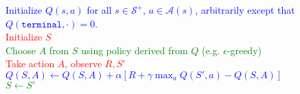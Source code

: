 \documentclass{standalone}
\begin{document}
\pagestyle{empty}
\begin{algorithm}[H]
  \KwInput{Step size $\alpha \in (0, 1]$, and a small $\epsilon > 0$.}
  \textcolor{blue}{Initialize $Q(s,a)$ for all $s \in \mathcal S^+$, $a \in \mathcal A(s)$,   arbitrarily except that $Q(\texttt{terminal}, \cdot) = 0$.\\}
 {
  \textcolor{red}{Initialize $S$} \\
   {
\textcolor{Green}{Choose $A$ from $S$ using policy derived from $Q$ (e.g. $\epsilon$-greedy)} \\
\textcolor{red}{Take action $A$, observe $R, S'$ \\}
\textcolor{blue}{
    $Q(S,A) \gets Q(S,A) + \alpha \left[R + \gamma \max_a Q(S', a) -       Q(S,A)\right]$ \\}
    \textcolor{Green}{$S \gets S'$}
  }
}
\end{algorithm}
\end{document}
